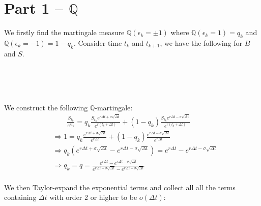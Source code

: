 \documentclass[12pt, letterpaper]{article}
\begin{document}
\section*{Part 1 -- $\mathbb{Q}$}
We firstly find the martingale measure $\mathbb{Q}(\epsilon_k = \pm 1)$ where $\mathbb{Q}(\epsilon_k =1) = q_k$ and $\mathbb{Q}(\epsilon_k =-1) = 1-q_k$. Consider 
time $t_k$ and $t_{k+1}$, we have the following for $B$ and $S$. \\ \\ 
\\
\\
We construct the following $\mathbb{Q}$-martingale:
\begin{align*}
&\qquad \frac{S_{t_k}}{e^{rt_k}} = q_k\frac{S_{t_k}e^{r\Delta t + \sigma \sqrt{\Delta t}}}{e^{r(t_k+\Delta t)}} + (1-q_k)\frac{S_{t_k}e^{r\Delta t - \sigma \sqrt{\Delta t}}}{e^{r(t_k+\Delta t)}}\\
&\Rightarrow 1 = q_k\frac{e^{r\Delta t + \sigma \sqrt{\Delta t}}}{e^{r\Delta t}} + (1-q_k) \frac{e^{r\Delta t - \sigma \sqrt{\Delta t}}}{e^{r\Delta t}} \\
&\Rightarrow q_k(e^{r\Delta t + \sigma \sqrt{\Delta t}} - e^{r\Delta t - \sigma \sqrt{\Delta t}}) = e^{r\Delta t} - e^{r\Delta t - \sigma \sqrt{\Delta t}} \\
&\Rightarrow q_k = q = \frac{e^{r\Delta t} - e^{r\Delta t - \sigma \sqrt{\Delta t}}}{e^{r\Delta t + \sigma \sqrt{\Delta t}} - e^{r\Delta t - \sigma \sqrt{\Delta t}}} \tag*{As $q_k$ does not depend on $k$}
\end{align*} 
\\
We then Taylor-expand the exponential terms and collect all all the terms containing $\Delta t$ with order 2 or higher to be $o(\Delta t)$:
\end{document}
